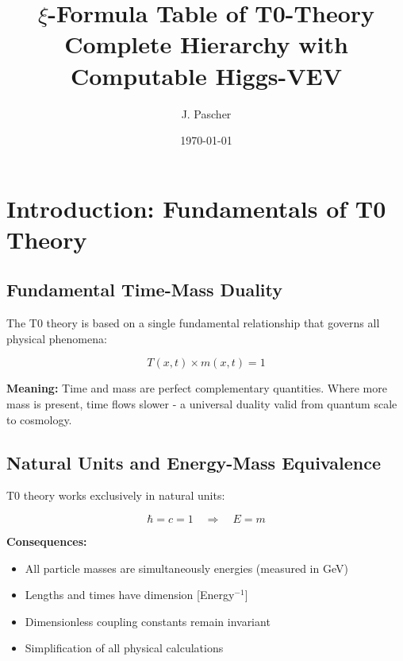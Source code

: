 \documentclass[12pt,a4paper]{article}
\begin{document}
	
	\title{\textbf{\(\xi\)-Formula Table of T0-Theory}\\
		\large Complete Hierarchy with Computable Higgs-VEV}
	
	\author{J. Pascher}
	\date{\today}
	
	\maketitle
\section{Introduction: Fundamentals of T0 Theory}

\subsection{Fundamental Time-Mass Duality}

The T0 theory is based on a single fundamental relationship that governs all physical phenomena:

\begin{equation}
	\boxed{T(x,t) \times m(x,t) = 1}
\end{equation}

\textbf{Meaning:} Time and mass are perfect complementary quantities. Where more mass is present, time flows slower - a universal duality valid from quantum scale to cosmology.

\subsection{Natural Units and Energy-Mass Equivalence}

T0 theory works exclusively in natural units:

\begin{equation}
	\boxed{\hbar = c = 1 \quad \Rightarrow \quad E = m}
\end{equation}

\textbf{Consequences:}
\begin{itemize}
	\item All particle masses are simultaneously energies (measured in GeV)
	\item Lengths and times have dimension [Energy$^{-1}$]
	\item Dimensionless coupling constants remain invariant
	\item Simplification of all physical calculations
\end{itemize}
\end{document}
